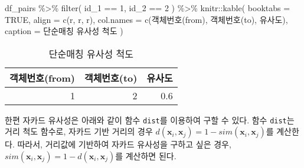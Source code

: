 \documentclass[
]{book}
\newenvironment{Shaded}{\begin{snugshade}}{\end{snugshade}}
\newcommand{\AttributeTok}[1]{\textcolor[rgb]{0.77,0.63,0.00}{#1}}
\newcommand{\ConstantTok}[1]{\textcolor[rgb]{0.00,0.00,0.00}{#1}}
\newcommand{\DecValTok}[1]{\textcolor[rgb]{0.00,0.00,0.81}{#1}}
\newcommand{\FunctionTok}[1]{\textcolor[rgb]{0.00,0.00,0.00}{#1}}
\newcommand{\NormalTok}[1]{#1}
\newcommand{\SpecialCharTok}[1]{\textcolor[rgb]{0.00,0.00,0.00}{#1}}
\newcommand{\StringTok}[1]{\textcolor[rgb]{0.31,0.60,0.02}{#1}}
\begin{document}
\begin{Shaded}
\begin{Highlighting}[]
\NormalTok{df\_pairs }\SpecialCharTok{\%\textgreater{}\%}
  \FunctionTok{filter}\NormalTok{(}
\NormalTok{    id\_1 }\SpecialCharTok{==} \DecValTok{1}\NormalTok{,}
\NormalTok{    id\_2 }\SpecialCharTok{==} \DecValTok{2}
\NormalTok{  ) }\SpecialCharTok{\%\textgreater{}\%}
\NormalTok{  knitr}\SpecialCharTok{::}\FunctionTok{kable}\NormalTok{(}
    \AttributeTok{booktabs =} \ConstantTok{TRUE}\NormalTok{,}
    \AttributeTok{align =} \FunctionTok{c}\NormalTok{(}\StringTok{\textquotesingle{}r\textquotesingle{}}\NormalTok{, }\StringTok{\textquotesingle{}r\textquotesingle{}}\NormalTok{, }\StringTok{\textquotesingle{}r\textquotesingle{}}\NormalTok{),}
    \AttributeTok{col.names =} \FunctionTok{c}\NormalTok{(}\StringTok{\textquotesingle{}객체번호(from)\textquotesingle{}}\NormalTok{, }\StringTok{\textquotesingle{}객체번호(to)\textquotesingle{}}\NormalTok{, }\StringTok{\textquotesingle{}유사도\textquotesingle{}}\NormalTok{),}
    \AttributeTok{caption =} \StringTok{\textquotesingle{}단순매칭 유사성 척도\textquotesingle{}}
\NormalTok{  )}
\end{Highlighting}
\end{Shaded}

\begin{table}

\caption{\label{tab:binary-simplematching}단순매칭 유사성 척도}
\centering
\begin{tabular}[t]{rrr}
\toprule
객체번호(from) & 객체번호(to) & 유사도\\
\midrule
1 & 2 & 0.6\\
\bottomrule
\end{tabular}
\end{table}

한편 자카드 유사성은 아래와 같이 함수 \texttt{dist}를 이용하여 구할 수 있다. 함수 \texttt{dist}는 거리 척도 함수로, 자카드 기반 거리의 경우 \(d(\mathbf{x}_i, \mathbf{x}_j) = 1 - sim(\mathbf{x}_i, \mathbf{x}_j)\)를 계산한다. 따라서, 거리값에 기반하여 자카드 유사성을 구하고 싶은 경우, \(sim(\mathbf{x}_i, \mathbf{x}_j) = 1 - d(\mathbf{x}_i, \mathbf{x}_j)\)를 계산하면 된다.
\end{document}
